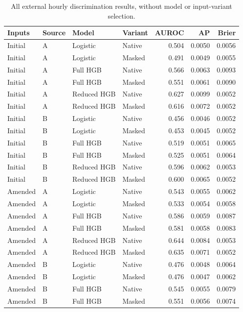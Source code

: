 \begin{table}[htbp]
\centering
\footnotesize
\setlength{\tabcolsep}{4pt}
\renewcommand{\arraystretch}{1.18}
\caption{All external hourly discrimination results, without model or input-variant selection.}\label{tab:sextdisc}
\begin{tabular}{llllrrr}
\toprule
Inputs & Source & Model & Variant & AUROC & AP & Brier \\
\midrule
Initial & A & Logistic & Native & 0.504 & 0.0050 & 0.0056 \\
Initial & A & Logistic & Masked & 0.491 & 0.0049 & 0.0055 \\
Initial & A & Full HGB & Native & 0.566 & 0.0063 & 0.0093 \\
Initial & A & Full HGB & Masked & 0.551 & 0.0061 & 0.0090 \\
Initial & A & Reduced HGB & Native & 0.627 & 0.0099 & 0.0052 \\
Initial & A & Reduced HGB & Masked & 0.616 & 0.0072 & 0.0052 \\
Initial & B & Logistic & Native & 0.456 & 0.0046 & 0.0052 \\
Initial & B & Logistic & Masked & 0.453 & 0.0045 & 0.0052 \\
Initial & B & Full HGB & Native & 0.519 & 0.0051 & 0.0065 \\
Initial & B & Full HGB & Masked & 0.525 & 0.0051 & 0.0064 \\
Initial & B & Reduced HGB & Native & 0.596 & 0.0062 & 0.0053 \\
Initial & B & Reduced HGB & Masked & 0.600 & 0.0065 & 0.0052 \\
Amended & A & Logistic & Native & 0.543 & 0.0055 & 0.0062 \\
Amended & A & Logistic & Masked & 0.533 & 0.0054 & 0.0058 \\
Amended & A & Full HGB & Native & 0.586 & 0.0059 & 0.0087 \\
Amended & A & Full HGB & Masked & 0.581 & 0.0058 & 0.0083 \\
Amended & A & Reduced HGB & Native & 0.644 & 0.0084 & 0.0053 \\
Amended & A & Reduced HGB & Masked & 0.635 & 0.0071 & 0.0052 \\
Amended & B & Logistic & Native & 0.476 & 0.0048 & 0.0064 \\
Amended & B & Logistic & Masked & 0.476 & 0.0047 & 0.0062 \\
Amended & B & Full HGB & Native & 0.545 & 0.0055 & 0.0079 \\
Amended & B & Full HGB & Masked & 0.551 & 0.0056 & 0.0074 \\

\end{tabular}
\end{table}
